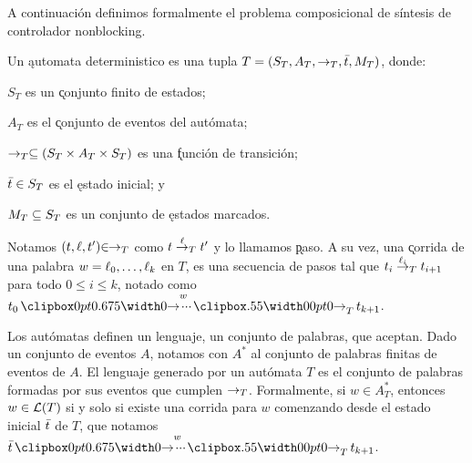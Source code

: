 A continuación definimos formalmente el problema composicional de síntesis de controlador nonblocking.

\begin{definition} \label{def:automata}
	Un \k{automata deterministico} es una tupla $T = (S_T, A_T, \rightarrow_T, \bar{t}, M_T)$, donde:
	\begin{itemize*}[label=]
		
		\item $S_T$ es un \k{conjunto finito de estados};
		
		\item $A_T$ es el \k{conjunto de eventos} del autómata;
		
		\item $\rightarrow_T \subseteq (S_T \times A_T \times S_T)$ es una \k{función de transición};
		
		\item $\bar{t} \in S_T$ es el \k{estado inicial}; y
		
		\item $M_T \subseteq S_T$ es un conjunto de \k{estados marcados}.
		
	\end{itemize*}
	
\end{definition}

\begin{notation} \label{not:paso}
	
	$\!\!$Notamos $(t,\ell,t') {\in}\!\! \rightarrow_T$ como $t \overset{\ell}{\rightarrow}_{T} t'$ y lo llamamos \k{paso}.
	A su vez, una \k{corrida} de una palabra $w = \ell_0,\ldots,\ell_k$ en $T$, es una secuencia de pasos tal que $t_i \overset{\ell_i}{\rightarrow}_{T} t_{i+1}$ para todo $0 \leq i \leq k$, notado como $t_0 \runw{w}{T} t_{k+1}$.
	
\end{notation}

Los autómatas definen un lenguaje, un conjunto de palabras, que aceptan. Dado un conjunto de eventos $A$, notamos con $A^*$ al conjunto de palabras finitas de eventos de $A$. El lenguaje generado por un autómata $T$ es el conjunto de palabras formadas por sus eventos que cumplen $\rightarrow_T$. Formalmente, si $w \in A_T^*$, entonces $w \in \mathcal{L}(T)$ si y solo si existe una corrida para $w$ comenzando desde el estado inicial $\bar{t}$ de $T$, que notamos $\init{t} \runw{w}{T} t_{k+1}$.


